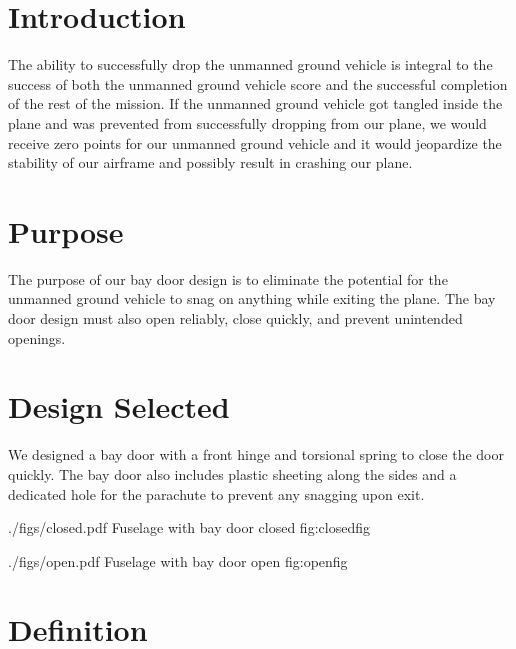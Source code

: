 \documentclass[]{auvsi_doc}
\begin{document}
\begin{AUVSITitlePage}
\begin{artifacttable}
\end{artifacttable}
\end{AUVSITitlePage}

\section{Introduction}

The ability to successfully drop the unmanned ground vehicle is integral to the success of both the unmanned ground vehicle score and the successful completion of the rest of the mission. If the unmanned ground vehicle got tangled inside the plane and was prevented from successfully dropping from our plane, we would receive zero points for our unmanned ground vehicle and it would jeopardize the stability of our airframe and possibly result in crashing our plane.

\section{Purpose}

The purpose of our bay door design is to eliminate the potential for the unmanned ground vehicle to snag on anything while exiting the plane. The bay door design must also open reliably, close quickly, and prevent unintended openings.

\section{Design Selected}

We designed a bay door with a front hinge and torsional spring to close the door quickly. The bay door also includes plastic sheeting along the sides and a dedicated hole for the parachute to prevent any snagging upon exit.

\AUVSIFigure
{./figs/closed.pdf}
{\textwidth}
{Fuselage with bay door closed}
{fig:closedfig}

\AUVSIFigure
{./figs/open.pdf}
{\textwidth}
{Fuselage with bay door open}
{fig:openfig}

\section{Definition}
\end{document}
